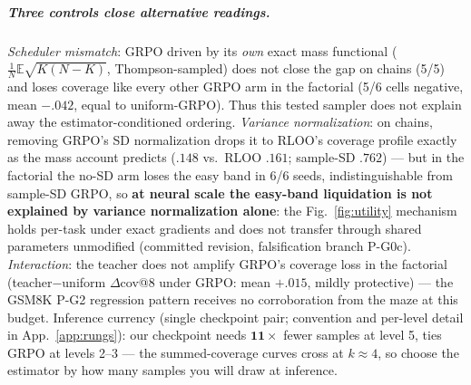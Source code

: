 \subparagraph{Three controls close alternative readings.}
\emph{Scheduler mismatch}: GRPO driven by its \emph{own} exact mass
functional ($\frac1N\mathbb{E}\sqrt{K(N{-}K)}$, Thompson-sampled) does
not close the gap on chains (5/5) and loses coverage like every other
GRPO arm in the factorial (5/6 cells negative, mean $-.042$, equal to
uniform-GRPO). Thus this tested sampler does not explain away the
estimator-conditioned ordering.
\emph{Variance normalization}: on chains, removing GRPO's SD
normalization drops it to RLOO's coverage profile exactly as the mass
account predicts ($.148$ vs.\ RLOO $.161$; sample-SD $.762$) --- but
in the factorial the no-SD arm loses the easy band in 6/6 seeds,
indistinguishable from sample-SD GRPO, so \textbf{at neural scale the
easy-band liquidation is not explained by variance normalization
alone}: the Fig.~\ref{fig:utility} mechanism holds per-task under
exact gradients and does not transfer through shared parameters
unmodified (committed revision, falsification branch P-G0c).
\emph{Interaction}: the teacher does not amplify GRPO's coverage loss
in the factorial (teacher$-$uniform $\Delta$cov@8 under GRPO: mean
$+.015$, mildly protective) --- the GSM8K P-G2 regression pattern
receives no corroboration from the maze at this budget. Inference
currency (single checkpoint pair; convention and per-level detail in
App.~\ref{app:rungs}): our checkpoint needs $\mathbf{11\times}$ fewer
samples at level 5, ties GRPO at levels 2--3 --- the summed-coverage
curves cross at $k{\approx}4$, so choose the estimator by how many
samples you will draw at inference.

